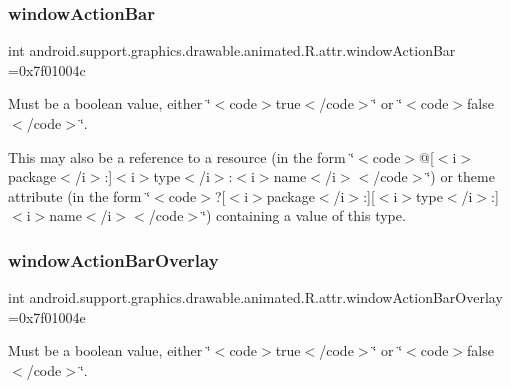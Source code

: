 \subsubsection{\texorpdfstring{window\+Action\+Bar}{windowActionBar}}
{\footnotesize\ttfamily int android.\+support.\+graphics.\+drawable.\+animated.\+R.\+attr.\+window\+Action\+Bar =0x7f01004c\hspace{0.3cm}{\ttfamily [static]}}

Must be a boolean value, either \char`\"{}$<$code$>$true$<$/code$>$\char`\"{} or \char`\"{}$<$code$>$false$<$/code$>$\char`\"{}. 

This may also be a reference to a resource (in the form \char`\"{}$<$code$>$@\mbox{[}$<$i$>$package$<$/i$>$\+:\mbox{]}$<$i$>$type$<$/i$>$\+:$<$i$>$name$<$/i$>$$<$/code$>$\char`\"{}) or theme attribute (in the form \char`\"{}$<$code$>$?\mbox{[}$<$i$>$package$<$/i$>$\+:\mbox{]}\mbox{[}$<$i$>$type$<$/i$>$\+:\mbox{]}$<$i$>$name$<$/i$>$$<$/code$>$\char`\"{}) containing a value of this type. \mbox{\label{classandroid_1_1support_1_1graphics_1_1drawable_1_1animated_1_1R_1_1attr_a72b49d83a662a9a92448e47398ae3513}} 
\subsubsection{\texorpdfstring{window\+Action\+Bar\+Overlay}{windowActionBarOverlay}}
{\footnotesize\ttfamily int android.\+support.\+graphics.\+drawable.\+animated.\+R.\+attr.\+window\+Action\+Bar\+Overlay =0x7f01004e\hspace{0.3cm}{\ttfamily [static]}}

Must be a boolean value, either \char`\"{}$<$code$>$true$<$/code$>$\char`\"{} or \char`\"{}$<$code$>$false$<$/code$>$\char`\"{}. 


